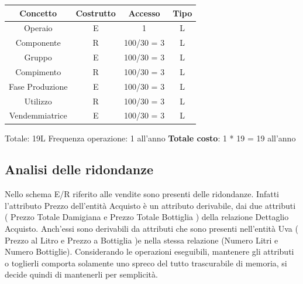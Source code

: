\documentclass{article}
\begin{document}
\begin{itemize}
\begin{figure}[htbp]
\end{figure}
\newline
\newline
\begin{tabular}{c|c|c|c}\hline
    \textbf{Concetto} & \textbf{Costrutto} &  \textbf{Accesso} & \textbf{Tipo} \\\hline
    Operaio & E & 1 & L\\\hline
    Componente & R&  100/30 = 3 & L \\\hline
    Gruppo & E &  100/30 = 3 & L\\\hline
    Compimento & R& 100/30 = 3 & L \\\hline
    Fase Produzione& E & 100/30 = 3 & L\\\hline
    Utilizzo & R& 100/30 = 3 & L \\\hline
    Vendemmiatrice& E &  100/30 = 3 & L\\\hline
\end{tabular}
\newline
Totale: 19L \qquad \qquad Frequenza operazione: 1 all'anno
\newline
\newline
\textbf{Totale costo}: 1 * 19 = 19 all'anno\\
\end{itemize}
\newpage
\subsection{Analisi delle ridondanze}
Nello schema E/R riferito alle vendite sono presenti delle ridondanze. 
Infatti l'attributo Prezzo dell'entità Acquisto è un attributo derivabile, dai due attributi ( Prezzo Totale Damigiana e Prezzo Totale Bottiglia ) della relazione Dettaglio Acquisto.
Anch'essi sono derivabili da attributi che sono presenti nell'entità Uva ( Prezzo al Litro e Prezzo a Bottiglia )e nella stessa relazione (Numero Litri e Numero Bottiglie).
Considerando le operazioni eseguibili, mantenere gli attributi o toglierli comporta solamente uno spreco del tutto trascurabile di memoria, si decide quindi di mantenerli per semplicità. 
\newpage
\end{document}
